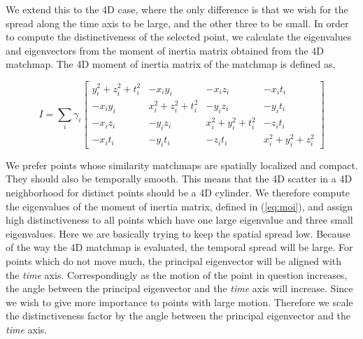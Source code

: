 We extend this to the 4D case, where the only difference is that we wish for the spread along the time axis to be large, and the other three to be small. In order to compute the distinctiveness of the selected point, we calculate the eigenvalues and eigenvectors from the moment of inertia matrix obtained from the 4D matchmap. The 4D moment of inertia matrix of the matchmap is defined as,

\begin{equation}
\label{eq:moi}
I = \sum_i \gamma_i \left[ 
\begin{array}{cccc}
	y_i^2+z_i^2+t_i^2 & -x_iy_i & -x_iz_i & -x_it_i \\
	-x_iy_i & x_i^2+z_i^2+t_i^2 &  -y_iz_i & -y_it_i \\
	-x_iz_i & -y_iz_i & x_i^2+y_i^2+t_i^2 &  -z_it_i \\
	-x_it_i & -y_it_i  &  -z_it_i & x_i^2+y_i^2+z_i^2 
\end{array}
\right]
\end{equation}

We prefer points whose similarity matchmaps are spatially localized and compact. They should also be temporally smooth. This means that the 4D scatter in a 4D neighborhood for distinct points should be a 4D cylinder. We therefore compute the eigenvalues of the moment of inertia matrix, defined in (\ref{eq:moi}), and assign high distinctiveness to all points which have one large eigenvalue and three small eigenvalues. Here we are basically trying to keep the spatial spread low. Because of the way the 4D matchmap is evaluated, the temporal spread will be large. For points which do not move much, the principal eigenvector will be aligned with the {\em time} axis. Correspondingly as the motion of the point in question increases, the angle between the principal eigenvector and the {\em time} axis will increase. Since we wish to give more importance to points with large motion. Therefore we scale the distinctiveness factor by the angle between the principal eigenvector and the {\em time} axis.


